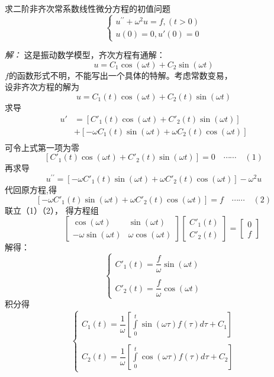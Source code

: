 \begin{example} 
	求二阶非齐次常系数线性微分方程的初值问题
	$$\begin{cases}
		u^{\prime \prime} +\omega ^2 u =f, (t>0)\\
		u(0)=0, u'(0)=0
	\end{cases}$$
\end{example}
	\emph{解：}
		这是振动数学模型，齐次方程有通解： 
		$$ u=C_1 \cos(\omega t)+C_2 \sin(\omega t) $$
		$f$的函数形式不明，不能写出一个具体的特解。考虑常数变易，\\
		设非齐次方程的解为 
		$$ u=C_1(t) \cos(\omega t)+C_2(t) \sin(\omega t) $$
		求导
$$ \begin{aligned}
	u'& =[C'_1(t) \cos(\omega t)+C'_2(t) \sin(\omega t)] \\
	&+ [  - \omega C_1(t) \sin(\omega t)+ \omega C_2(t) \cos(\omega t)  ] \\ 
\end{aligned}  $$
可令上式第一项为零 $$[C'_1(t) \cos(\omega t)+C'_2(t) \sin(\omega t)]=0 \quad \cdots \cdots \quad (1) $$
再求导
$$ u^{\prime \prime}= [  - \omega C'_1(t) \sin(\omega t)+ \omega C'_2(t) \cos(\omega t)  ] -\omega^2 u  $$
代回原方程,得
$$ [  - \omega C'_1(t) \sin(\omega t)+ \omega C'_2(t) \cos(\omega t)  ] =f      \quad \cdots \cdots \quad (2) $$
联立（1）（2）， 得方程组
$$\qquad \begin{bmatrix}
		\cos(\omega t) & \sin(\omega t) \\ 
		-\omega \sin(\omega t) & \omega\cos(\omega t)
	\end{bmatrix} 
\begin{bmatrix}
		C'_1(t)\\ 
		C'_2(t)
	\end{bmatrix}  =
\begin{bmatrix}
		0\\ 
		f
	\end{bmatrix} $$
解得：
	$$ \begin{cases}
			C'_1(t)=\dfrac{f}{\omega} \sin(\omega t)  \\ 
			\\
			C'_2(t)=\dfrac{f}{\omega} \cos(\omega t)  
		\end{cases}  $$
积分得
		$$ \displaystyle \begin{cases}
				C_1(t)=\dfrac{1}{\omega} [\int\limits_{0}^{t} \sin(\omega \tau) f(\tau)  d\tau +C_1 ]\\  \\
				C_2(t)=\dfrac{1}{\omega} [\int\limits_{0}^{t} \cos(\omega \tau) f(\tau)  d\tau +C_2 ]
			\end{cases}  $$
